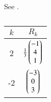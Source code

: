 See 
.
\begin{table}[!ht]
\centering
\caption{}
\label{tab:chapters/12/10/2/15/}
\begin{tabular}{|c|c|}
\hline
$k$ & $R_k$ \\
\hline
2 & $\frac{1}{3}\begin{pmatrix}-1 \\ 4 \\ 1\end{pmatrix}$ \\
\hline
-2 & $\begin{pmatrix}-3 \\ 0 \\ 3\end{pmatrix}$ \\
\hline
\end{tabular}
\end{table}
